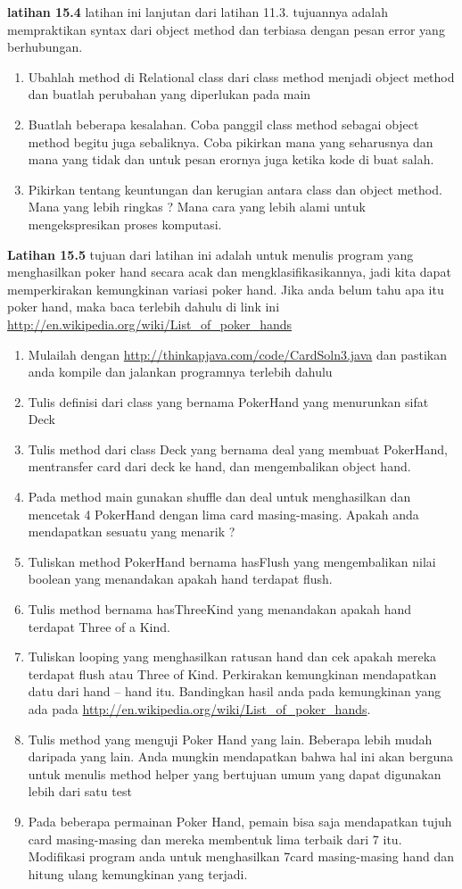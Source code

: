 \textbf{latihan 15.4} latihan ini lanjutan dari latihan 11.3. tujuannya adalah mempraktikan syntax dari object  method dan terbiasa dengan pesan error yang berhubungan.
\begin{enumerate}
	\item Ubahlah method di Relational class dari class method menjadi object method dan buatlah perubahan yang diperlukan pada main
	\item Buatlah beberapa kesalahan. Coba panggil class method sebagai object method begitu juga sebaliknya. Coba pikirkan mana yang seharusnya dan mana yang tidak dan untuk pesan erornya juga ketika kode di buat salah.
	\item Pikirkan tentang keuntungan dan kerugian antara class dan object method. Mana yang lebih ringkas ? Mana cara yang lebih alami untuk mengekspresikan proses komputasi.
\end{enumerate}

\textbf{Latihan 15.5} tujuan dari latihan ini adalah untuk menulis program yang menghasilkan poker hand secara acak dan mengklasifikasikannya, jadi kita dapat memperkirakan kemungkinan variasi poker hand. Jika anda belum tahu apa itu poker hand, maka baca terlebih dahulu di link ini
\url{http://en.wikipedia.org/wiki/List_of_poker_hands}
\begin{enumerate}
	\item Mulailah dengan \url{http://thinkapjava.com/code/CardSoln3.java} dan pastikan anda kompile dan jalankan programnya terlebih dahulu
	\item Tulis definisi dari class yang bernama PokerHand yang menurunkan sifat Deck
	\item Tulis method dari class Deck yang bernama deal yang membuat PokerHand, mentransfer card dari deck ke hand, dan mengembalikan object hand.
	\item Pada method main gunakan shuffle dan deal untuk menghasilkan dan mencetak 4 PokerHand dengan lima card masing-masing. Apakah anda mendapatkan sesuatu yang menarik ?
	\item Tuliskan method PokerHand bernama hasFlush yang mengembalikan nilai boolean yang menandakan apakah hand terdapat flush.
	\item Tulis method bernama hasThreeKind yang menandakan apakah hand terdapat Three of a Kind.
	\item Tuliskan looping yang menghasilkan ratusan hand dan cek apakah mereka terdapat flush atau Three of Kind. Perkirakan kemungkinan mendapatkan datu dari hand – hand itu. Bandingkan hasil anda pada kemungkinan yang ada pada \url{http://en.wikipedia.org/wiki/List_of_poker_hands}.
	\item Tulis method yang menguji Poker Hand yang lain. Beberapa lebih mudah daripada yang lain. Anda mungkin mendapatkan bahwa hal ini akan berguna untuk menulis method helper yang bertujuan umum yang dapat digunakan lebih dari satu test 
	\item Pada beberapa permainan Poker Hand, pemain bisa saja mendapatkan tujuh card masing-masing dan mereka membentuk lima terbaik dari 7 itu. Modifikasi program anda untuk menghasilkan 7card masing-masing hand dan hitung ulang kemungkinan yang terjadi.
\end{enumerate}
